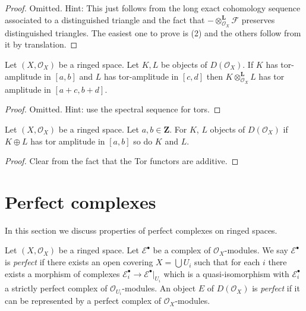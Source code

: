 \begin{proof}
Omitted. Hint: This just follows from the long exact cohomology sequence
associated to a distinguished triangle and the fact that
$- \otimes_{\mathcal{O}_X}^{\mathbf{L}} \mathcal{F}$
preserves distinguished triangles.
The easiest one to prove is (2) and the others follow from it by
translation.
\end{proof}

\begin{lemma}
\label{lemma-tensor-tor-amplitude}
Let $(X, \mathcal{O}_X)$ be a ringed space. Let $K, L$ be objects of
$D(\mathcal{O}_X)$. If $K$ has tor-amplitude in $[a, b]$ and
$L$ has tor-amplitude in $[c, d]$ then $K \otimes_{\mathcal{O}_X}^\mathbf{L} L$
has tor amplitude in $[a + c, b + d]$.
\end{lemma}

\begin{proof}
Omitted. Hint: use the spectral sequence for tors.
\end{proof}

\begin{lemma}
\label{lemma-summands-tor-amplitude}
Let $(X, \mathcal{O}_X)$ be a ringed space. Let $a, b \in \mathbf{Z}$.
For $K$, $L$ objects of $D(\mathcal{O}_X)$ if $K \oplus L$ has tor
amplitude in $[a, b]$ so do $K$ and $L$.
\end{lemma}

\begin{proof}
Clear from the fact that the Tor functors are additive.
\end{proof}






\section{Perfect complexes}
\label{section-perfect}

\noindent
In this section we discuss properties of perfect complexes on
ringed spaces.

\begin{definition}
\label{definition-perfect}
Let $(X, \mathcal{O}_X)$ be a ringed space.
Let $\mathcal{E}^\bullet$ be a complex of $\mathcal{O}_X$-modules.
We say $\mathcal{E}^\bullet$ is {\it perfect} if there exists
an open covering $X = \bigcup U_i$ such that for each $i$
there exists a morphism of complexes
$\mathcal{E}_i^\bullet \to \mathcal{E}^\bullet|_{U_i}$
which is a quasi-isomorphism with $\mathcal{E}_i^\bullet$
a strictly perfect complex of $\mathcal{O}_{U_i}$-modules.
An object $E$ of $D(\mathcal{O}_X)$ is {\it perfect}
if it can be represented by a perfect complex of $\mathcal{O}_X$-modules.
\end{definition}

